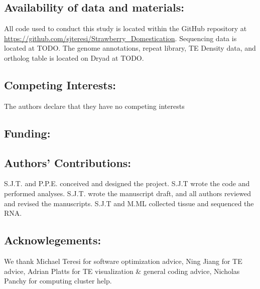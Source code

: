 \documentclass[fleqn,10pt]{olplainarticle}
\begin{document}
\subsection{Availability of data and materials:}
All code used to conduct this study is located within the GitHub repository at \url{https://github.com/sjteresi/Strawberry_Domestication}.
Sequencing data is located at TODO.
The genome annotations, repeat library, TE Density data, and ortholog table is located on Dryad at TODO.

\subsection{Competing Interests:}
The authors declare that they have no competing interests

\subsection{Funding:}

\subsection{Authors' Contributions:}
S.J.T. and P.P.E. conceived and designed the project.
S.J.T wrote the code and performed analyses.
S.J.T. wrote the manuscript draft, and all authors reviewed and revised the manuscripts.
S.J.T and M.ML collected tissue and sequenced the RNA.

\subsection{Acknowlegements:}
We thank Michael Teresi for software optimization advice, Ning Jiang for TE advice, Adrian Platts for TE visualization \& general coding advice, Nicholas Panchy for computing cluster help.

\newpage

\end{document}
